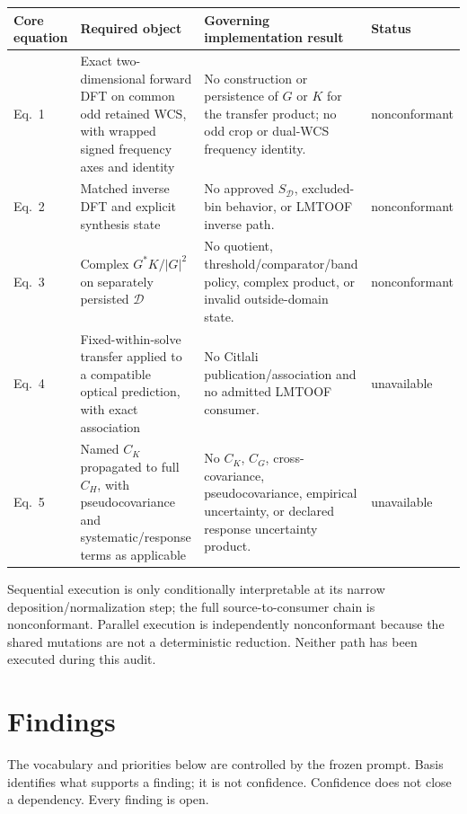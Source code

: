 \documentclass[10pt]{article}
\begin{document}
\begin{longtable}{@{}L{0.10\textwidth}L{0.27\textwidth}L{0.42\textwidth}L{0.14\textwidth}@{}}
\toprule
Core equation & Required object & Governing implementation result & Status \\
\midrule
\endhead
Eq.~1 & Exact two-dimensional forward DFT on common odd retained WCS, with
wrapped signed frequency axes and identity & No construction or persistence of
$G$ or $K$ for the transfer product; no odd crop or dual-WCS frequency
identity. & nonconformant \\
Eq.~2 & Matched inverse DFT and explicit synthesis state & No approved
$S_{\mathcal D}$, excluded-bin behavior, or LMTOOF inverse path. &
nonconformant \\
Eq.~3 & Complex $G^*K/|G|^2$ on separately persisted $\mathcal D$ &
No quotient, threshold/comparator/band policy, complex product, or invalid
outside-domain state. & nonconformant \\
Eq.~4 & Fixed-within-solve transfer applied to a compatible optical
prediction, with exact association & No Citlali publication/association and
no admitted LMTOOF consumer. & unavailable \\
Eq.~5 & Named $C_K$ propagated to full $C_H$, with pseudocovariance and
systematic/response terms as applicable & No $C_K$, $C_G$, cross-covariance,
pseudocovariance, empirical uncertainty, or declared response uncertainty
product. & unavailable \\
\bottomrule
\end{longtable}

Sequential execution is only conditionally interpretable at its narrow
deposition/normalization step; the full source-to-consumer chain is
nonconformant.  Parallel execution is independently nonconformant because the
shared mutations are not a deterministic reduction.  Neither path has been
executed during this audit.

\section{Findings}

The vocabulary and priorities below are controlled by the frozen prompt.
Basis identifies what supports a finding; it is not confidence.
Confidence does not close a dependency.  Every finding is open.
\end{document}
